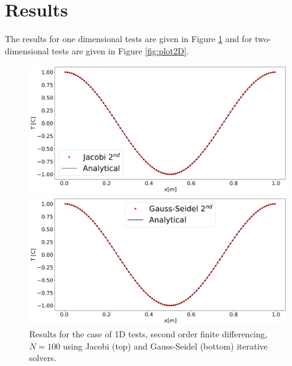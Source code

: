 \documentclass[12pt]{amsart}   %
\begin{document}
\section{Results}
The results for one dimensional tests are given in Figure \ref{fig:plot1D} and for two-dimensional tests are given in Figure \ref{fig:plot2D}.

\begin{figure}[htbp!] 
\begin{minipage}[htbp!]{\linewidth}
  \centering
    \includegraphics[width=\linewidth,keepaspectratio, trim = 0cm 0cm 0cm 0cm,clip]{Project1photos/plot_Jacobi_1D_order2_n100.png}
\end{minipage}
\begin{minipage}[]{\linewidth}
  \centering
    \includegraphics[width=\linewidth,keepaspectratio]{Project1photos/plot_GS_1D_order2_n100.png}
\end{minipage}
\caption{Results for the case of 1D tests, second order finite differencing, $N=100$ using Jacobi (top) and Gauss-Seidel (bottom) iterative solvers.} \label{fig:plot1D}
\end{figure}
\end{document}
